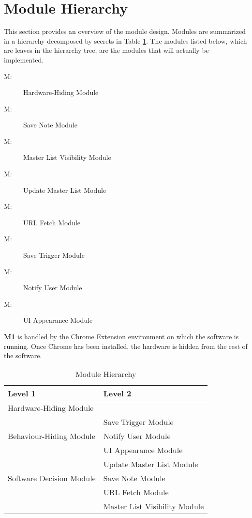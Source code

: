 \documentclass[12pt, titlepage]{article}
\newcounter{mnum}
\newcommand{\mthemnum}{M\themnum}
\begin{document}
\section{Module Hierarchy} \label{SecMH}

This section provides an overview of the module design. Modules are summarized
in a hierarchy decomposed by secrets in Table \ref{TblMH}. The modules listed
below, which are leaves in the hierarchy tree, are the modules that will
actually be implemented.

\begin{description}
\item [ \mthemnum \label{mHH}:] Hardware-Hiding Module
\item [ \mthemnum \label{mSave}:] Save Note Module
\item [ \mthemnum \label{mVisibility}:] Master List 
Visibility Module
\item [ \mthemnum \label{mUpdate}:] Update Master List 
Module
\item [ \mthemnum \label{mURL}:] URL Fetch Module
\item [ \mthemnum \label{mTrigger}:] Save Trigger Module
\item [ \mthemnum \label{mNotify}:] Notify User Module
\item [ \mthemnum \label{mUI}:] UI Appearance Module
\end{description}

\textbf{M1} is handled by the Chrome Extension environment on which the 
software is running. Once Chrome has been installed, the hardware is hidden 
from the rest of the software.\\

\begin{table}[h!]
\centering
\begin{tabular}{p{} p{}}
\toprule
\textbf{Level 1} & \textbf{Level 2}\\
\midrule

{Hardware-Hiding Module} & ~ \\
\midrule

\multirow{3}{0.3\textwidth}{Behaviour-Hiding Module} & Save Trigger Module\\
& Notify User Module\\
& UI Appearance Module\\
\midrule

\multirow{3}{0.3\textwidth}{Software Decision Module} & {
	Update Master List Module}\\
& Save Note Module\\
& URL Fetch Module\\
& Master List Visibility Module\\
\bottomrule

\end{tabular}
\caption{Module Hierarchy}
\label{TblMH}
\end{table}
\end{document}
